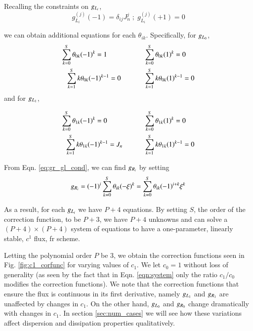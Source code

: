 Recalling the constraints on $\gL$,
\begin{equation}
 g^{(j)}_{L_i}(-1) = \delta_{ij} J_n^j \; ; \;   g^{(j)}_{L_i}(+1) = 0
\end{equation}

we can obtain additional equations for each $\theta_{ik}$. Specifically, for $\gL[0]$,
\begin{equation}
\begin{split}
\sum^S_{k=0} \theta_{0k}(-1)^k = 1\hspace{0.7cm} \text{ \hspace{1cm} }
&\sum^S_{k=0}
\theta_{0k}(1)^k = 0\\
\sum^S_{k=1} k\theta_{0k}(-1)^{k-1} = 0 \text{ \hspace{1cm} } &\sum^S_{k=1}
k\theta_{0k}(1)^{k-1} = 0
\end{split}
\end{equation}
and for $\gL[1]$,

\begin{equation}
\begin{split}
\sum^S_{k=0} \theta_{1k}(-1)^k = 0\hspace{0.7cm} \text{ \hspace{1cm} }
&\sum^S_{k=0}
\theta_{1k}(1)^k = 0\\
\sum^S_{k=1} k\theta_{1k}(-1)^{k-1} = J_n \text{ \hspace{1cm}} & \sum^S_{k=1}
k\theta_{1k}(1)^{k-1} = 0
\end{split}
\end{equation}

From Eqn. \eqref{eq:gr_gl_cond}, we can find $\gR$ by setting
\begin{equation}
\gR = (-1)^i\sum_{k=0}^S \theta_{ik}(-\xi)^k = \sum_{k=0}^S \theta_{ik}(-1)^{i+k}\xi^k
\end{equation}

As a result, for each $\gL$ we have $P+4$ equations. By setting $S$, the order of the correction function, to be $P+3$, we have $P+4$ unknowns and can solve a $(P+4)\times(P+4)$ system of equations to have a one-parameter, linearly stable, $c^{1}$ flux, \gls{fr} scheme.

Letting the polynomial order $P$ be $3$, we obtain the correction functions seen in Fig. \ref{fig:c1_corfunc} for varying values of $c_1$. We let $c_0 = 1$ without loss of generality (as seen by the fact that in Eqn. \eqref{eqn:system} only the ratio $c_1/c_0$ modifies the correction functions). We note that the correction functions that ensure the flux is continuous in its first derivative, namely $\gL[1]$ and $\gR[1]$ are unaffected by changes in $c_1$. On the other hand, $\gL[0]$ and $\gR[0]$ change dramatically with changes in $c_1$. In section \ref{sec:num_cases} we will see how these variations affect dispersion and dissipation properties qualitatively.

